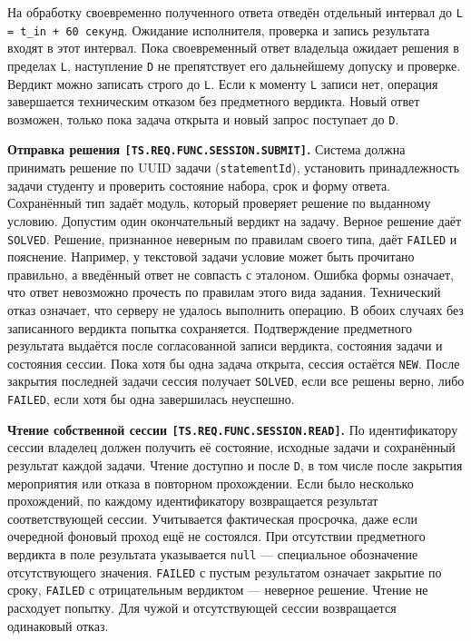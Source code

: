 \documentclass[12pt,a4paper]{article}
\begin{document}
На обработку своевременно полученного ответа отведён отдельный интервал до \texttt{L =\allowbreak{} t\_\allowbreak{}in + 60 секунд}. Ожидание исполнителя, проверка и запись результата входят в этот интервал. Пока своевременный ответ владельца ожидает решения в пределах \texttt{L}, наступление \texttt{D} не препятствует его дальнейшему допуску и проверке. Вердикт можно записать строго до \texttt{L}. Если к моменту \texttt{L} записи нет, операция завершается техническим отказом без предметного вердикта. Новый ответ возможен, только пока задача открыта и новый запрос поступает до \texttt{D}.

\hypertarget{ts-req-func-session-submit}{} \textbf{Отправка решения \texttt{[TS.\allowbreak{}REQ.\allowbreak{}FUNC.\allowbreak{}SESSION.\allowbreak{}SUBMIT]}.} Система должна принимать решение по UUID задачи (\texttt{statementId}), установить принадлежность задачи студенту и проверить состояние набора, срок и форму ответа. Сохранённый тип задаёт модуль, который проверяет решение по выданному условию. Допустим один окончательный вердикт на задачу. Верное решение даёт \texttt{SOLVED}. Решение, признанное неверным по правилам своего типа, даёт \texttt{FAILED} и пояснение. Например, у текстовой задачи условие может быть прочитано правильно, а введённый ответ не совпасть с эталоном. Ошибка формы означает, что ответ невозможно прочесть по правилам этого вида задания. Технический отказ означает, что серверу не удалось выполнить операцию. В обоих случаях без записанного вердикта попытка сохраняется. Подтверждение предметного результата выдаётся после согласованной записи вердикта, состояния задачи и состояния сессии. Пока хотя бы одна задача открыта, сессия остаётся \texttt{NEW}. После закрытия последней задачи сессия получает \texttt{SOLVED}, если все решены верно, либо \texttt{FAILED}, если хотя бы одна завершилась неуспешно.

\hypertarget{ts-req-func-session-read}{} \textbf{Чтение собственной сессии \texttt{[TS.\allowbreak{}REQ.\allowbreak{}FUNC.\allowbreak{}SESSION.\allowbreak{}READ]}.} По идентификатору сессии владелец должен получить её состояние, исходные задачи и сохранённый результат каждой задачи. Чтение доступно и после \texttt{D}, в том числе после закрытия мероприятия или отказа в повторном прохождении. Если было несколько прохождений, по каждому идентификатору возвращается результат соответствующей сессии. Учитывается фактическая просрочка, даже если очередной фоновый проход ещё не состоялся. При отсутствии предметного вердикта в поле результата указывается \texttt{null} --- специальное обозначение отсутствующего значения. \texttt{FAILED} с пустым результатом означает закрытие по сроку, \texttt{FAILED} с отрицательным вердиктом --- неверное решение. Чтение не расходует попытку. Для чужой и отсутствующей сессии возвращается одинаковый отказ.
\end{document}
